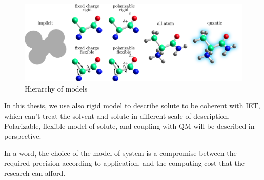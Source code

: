 \begin{flushright}
\begin{figure}[h]
\centering{}%
\begin{minipage}[t]{1\columnwidth}%
\begin{center}
\includegraphics[width=1\columnwidth]{_figure/solute}
\par\end{center}%
\end{minipage}\caption{Hierarchy of models\label{fig:Hierarchy-of-models}}
\end{figure}

\par\end{flushright}

In this thesis, we use also rigid model to describe solute to be coherent
with IET, which can't treat the solvent and solute in different scale
of description. Polarizable, flexible model of solute, and coupling
with QM will be described in perspective.

In a word, the choice of the model of system is a compromise between
the required precision according to application, and the computing
cost that the research can afford.
